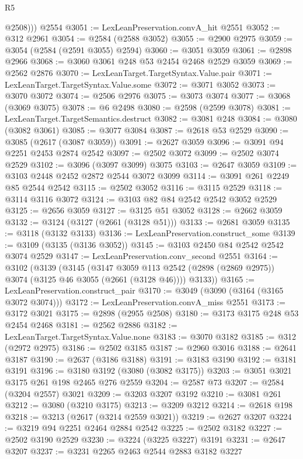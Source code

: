 \begin{lexlean}{R5}
\begin{coremodule}
          @2508)))
    @2554
@3051 := LexLeanPreservation.convA_hit @2551
@3052 := @312 @2961
@3054 := @2584 (@2588 @3052)
@3055 := @2900 @2975
@3059 := @3054 (@2584 (@2591 @3055) @2594)
@3060 := @3051 @3059
@3061 := @2898 @2966
@3068 := @3060 @3061 @248 @53 @2454 @2468 @2529 @3059
@3069 := @2562 @2876
@3070 := LexLeanTarget.TargetSyntax.Value.pair
@3071 := LexLeanTarget.TargetSyntax.Value.some
@3072 := @3071 @3052
@3073 := @3070 @3072
@3074 := @2506 @2976
@3075 := @3073 @3074
@3077 := @3068 (@3069 @3075)
@3078 := @6 @2498
@3080 := @2598 (@2599 @3078)
@3081 := LexLeanTarget.TargetSemantics.destruct
@3082 := @3081 @248
@3084 := @3080 (@3082 @3061)
@3085 := @3077 @3084
@3087 := @2618 @53 @2529
@3090 := @3085 (@2617 (@3087 @3059))
@3091 := @2627 @3059
@3096 := @3091 @94 @2251 @2453 @2874 @2542
@3097 := @2502 @3072
@3099 := @2502 @3074 @2529
@3102 := @3096 (@3097 @3099) @3075
@3103 := @2647 @3059
@3109 := @3103 @2448 @2452 @2872 @2544 @3072 @3099
@3114 := @3091 @261 @2249 @85 @2544 @2542
@3115 := @2502 @3052
@3116 := @3115 @2529
@3118 := @3114 @3116 @3072
@3124 := @3103 @82 @84 @2542 @2542 @3052 @2529
@3125 := @2656 @3059
@3127 := @3125 @51 @3052
@3128 := @2662 @3059
@3132 := @3124 (@3127 (@2661 (@3128 @51)))
@3133 := @2681 @3059
@3135 := @3118 (@3132 @3133)
@3136 := LexLeanPreservation.construct_some
@3139 := @3109 (@3135 (@3136 @3052))
@3145 := @3103 @2450 @84 @2542 @2542 @3074 @2529
@3147 := LexLeanPreservation.conv_second @2551
@3164 := @3102
    (@3139
      (@3145
        (@3147 @3059 @113 @2542 (@2898 (@2869 @2975)) @3074 (@3125 @46 @3055 (@2661 (@3128 @46))))
        @3133))
@3165 := LexLeanPreservation.construct_pair
@3170 := @3049 (@3090 (@3164 (@3165 @3072 @3074)))
@3172 := LexLeanPreservation.convA_miss @2551
@3173 := @3172 @3021
@3175 := @2898 (@2955 @2508)
@3180 := @3173 @3175 @248 @53 @2454 @2468
@3181 := @2562 @2886
@3182 := LexLeanTarget.TargetSyntax.Value.none
@3183 := @3070 @3182
@3185 := @312 (@2972 @2975)
@3186 := @2502 @3185
@3187 := @2960 @3016
@3188 := @2641 @3187
@3190 := @2637 (@3186 @3188)
@3191 := @3183 @3190
@3192 := @3181 @3191
@3196 := @3180 @3192 (@3080 (@3082 @3175))
@3203 := @3051 @3021 @3175 @261 @198 @2465 @276 @2559
@3204 := @2587 @73
@3207 := @2584 (@3204 @2557) @3021
@3209 := @3203 @3207 @3192
@3210 := @3081 @261
@3212 := @3080 (@3210 @3175)
@3213 := @3209 @3212
@3214 := @2618 @198
@3218 := @3213 (@2617 (@3214 @2559 @3021))
@3219 := @2627 @3207
@3224 := @3219 @94 @2251 @2464 @2884 @2542
@3225 := @2502 @3182
@3227 := @2502 @3190 @2529
@3230 := @3224 (@3225 @3227) @3191
@3231 := @2647 @3207
@3237 := @3231 @2265 @2463 @2544 @2883 @3182 @3227

\end{coremodule}
\end{lexlean}
